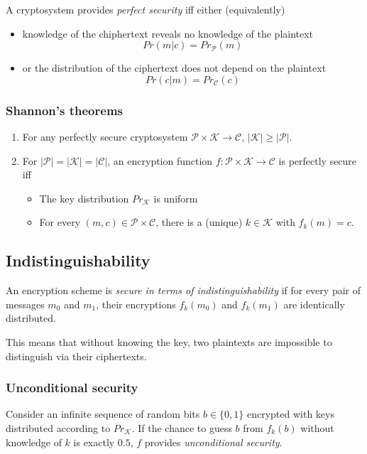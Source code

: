 \documentclass[a4paper]{scrartcl}
\newcommand\cP{\mathcal P}
\newcommand\cC{\mathcal C}
\newcommand\cK{\mathcal K}
\newcommand\Prob{\mathit{Pr}}
\begin{document}
\bigskip
A cryptosystem provides \textit{perfect security} iff either (equivalently)
\begin{itemize}
    \item knowledge of the chiphertext reveals no knowledge of the plaintext
        \[\Prob(m|c)=\Prob_\cP(m)\]
    \item or the distribution of the ciphertext does not depend on the plaintext
        \[\Prob(c|m)=\Prob_\cC(c)\]
\end{itemize}

\subsubsection{Shannon's theorems}
\begin{enumerate}
    \item For any perfectly secure cryptosystem $\cP\times\cK\rightarrow\cC$, $|\cK|\geq|\cP|$.
    \item For $|\cP|=|\cK|=|\cC|$, an encryption function $f:\cP\times\cK\rightarrow\cC$ is
        perfectly secure iff
        \begin{itemize}
            \item The key distribution $\Prob_\cK$ is uniform
            \item For every $(m,c)\in\cP\times\cC$, there is a (unique) $k\in\cK$ with $f_k(m)=c$.
        \end{itemize}
\end{enumerate}

\subsection{Indistinguishability}

An encryption scheme is \textit{secure in terms of indistinguishability} if for every
pair of messages $m_0$ and $m_1$, their encryptions $f_k(m_0)$ and $f_k(m_1)$ are
identically distributed.

This means that without knowing the key, two plaintexts are impossible to distinguish
via their ciphertexts.

\subsubsection{Unconditional security}

Consider an infinite sequence of random bits $b\in\{0,1\}$ encrypted with keys distributed
according to $\Prob_\cK$. If the chance to guess $b$ from $f_k(b)$ without knowledge of $k$
is exactly $0.5$, $f$ provides \textit{unconditional security}.
\end{document}
